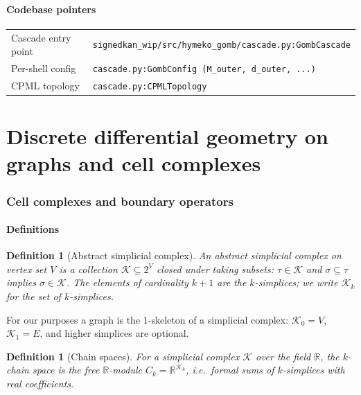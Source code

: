 \documentclass[11pt,a4paper]{article}
\newtheorem{definition}[theorem]{Definition}
\theoremstyle{remark}
\newcommand{\R}{\mathbb{R}}
\begin{document}
\subsection{Codebase pointers}

\begin{tabular}{ll}
Cascade entry point & \texttt{signedkan\_wip/src/hymeko\_gomb/cascade.py:GombCascade} \\
Per-shell config & \texttt{cascade.py:GombConfig (M\_outer, d\_outer, ...)} \\
CPML topology & \texttt{cascade.py:CPMLTopology} \\
\end{tabular}

\bigskip
\part{Discrete differential geometry on graphs and cell complexes}

\section{Cell complexes and boundary operators}\label{sec:cell-complexes}

\subsection{Definitions}

\begin{definition}[Abstract simplicial complex]
An \emph{abstract simplicial complex} on vertex set $V$ is a
collection $\mathcal{K} \subseteq 2^V$ closed under taking
subsets: $\tau \in \mathcal{K}$ and $\sigma \subseteq \tau$
implies $\sigma \in \mathcal{K}$. The elements of cardinality
$k+1$ are the \emph{$k$-simplices}; we write $\mathcal{K}_k$ for
the set of $k$-simplices.
\end{definition}

For our purposes a graph is the $1$-skeleton of a simplicial
complex: $\mathcal{K}_0 = V$, $\mathcal{K}_1 = E$, and higher
simplices are optional.

\begin{definition}[Chain spaces]
For a simplicial complex $\mathcal{K}$ over the field $\R$, the
\emph{$k$-chain space} is the free $\R$-module
$C_k = \R^{\mathcal{K}_k}$, i.e.\ formal sums of $k$-simplices
with real coefficients.
\end{definition}
\end{document}
